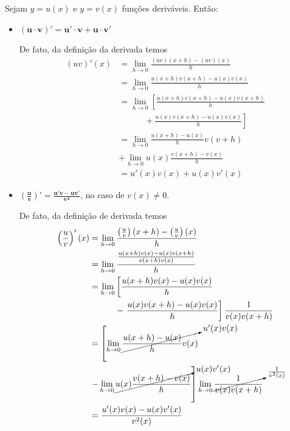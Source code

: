 \cleardoublepage\documentclass[../main.tex]{subfiles}
\begin{document}
Sejam $y = u(x)$ e $y = v(x)$ funções deriváveis. Então:
\begin{itemize}
\item $\boldsymbol{(u\cdot v)' = u'\cdot v+u\cdot v'}$

  De fato, da definição da derivada temos
  \begin{align*}
    (uv)'(x) &= \lim_{h\to 0} \frac{(uv)(x+h)-(uv)(x)}{h}\\
             &= \lim_{h\to 0} \frac{u(x+h)v(x+h)-u(x)v(x)}{h}\\
             &= \lim_{h\to 0} \left[\frac{u(x+h)v(x+h)-u(x)v(x+h)}{h}\right.\\
             &\qquad\quad+ \left.\frac{u(x)v(x+h)-u(x)v(x)}{h}\right]\\
             &= \lim_{h\to 0} \frac{u(x+h)-u(x)}{h}v(v+h) \\
             &+ \lim_{h\to 0} u(x)\frac{v(x+h)-v(x)}{h}\\
             &= u'(x)v(x) + u(x)v'(x)
  \end{align*}
  
\item $\displaystyle\boldsymbol{\left(\frac{u}{v}\right)' = \frac{u'v-uv'}{v^2}}$, no caso de $v(x)\neq 0$.

  De fato, da definição de derivada temos
  \begin{align*}
    \left(\frac{u}{v}\right)'(x) &= \lim_{h\to 0} \frac{\left(\frac{u}{v}\right)(x+h)-\left(\frac{u}{v}\right)(x)}{h} \\
                                 &= \lim_{h\to 0} \frac{\frac{u(x+h)v(x)-u(x)v(x+h)}{v(x+h)v(x)}}{h}\\
                                 &= \lim_{h\to 0} \left[\frac{u(x+h)v(x)-u(x)v(x)}{h}\right. \\
                                 &\qquad\quad - \left.\frac{u(x)v(x+h)-u(x)v(x)}{h}\right]\frac{1}{v(x)v(x+h)}\\
                                 &= \left[\lim_{h\to 0} \cancelto{u'(x)v(x)}{\frac{u(x+h)-u(x)}{h}v(x)}\right. \\
                                 &\left. - \lim_{h\to 0} \cancelto{u(x)v'(x)}{u(x)\frac{v(x+h)-v(x)}{h}}\right]\lim_{h\to 0} \cancelto{\frac{1}{v^2(x)}}{\frac{1}{v(x)v(x+h)}}\\
                                 &= \frac{u'(x)v(x)-u(x)v'(x)}{v^2(x)}
  \end{align*}
  
  
  \end{itemize}
\end{document}
